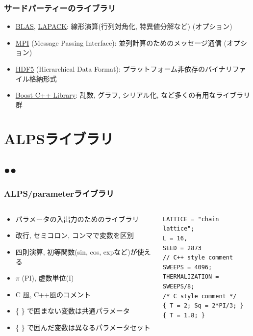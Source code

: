 \begin{frame}
  \frametitle{サードパーティーのライブラリ}
  \begin{itemize}
    \setlength{\itemsep}{1em}
  \item \href{http://www.netlib.org/blas/}{BLAS}, \href{http://www.netlib.org/lapack/}{LAPACK}: 線形演算(行列対角化, 特異値分解など) (オプション)
  \item \href{http://www.mpi-forum.org/}{MPI} (Message Passing Interface): 並列計算のためのメッセージ通信 (オプション)
  \item \href{http://www.hdfgroup.org/HDF5/}{HDF5} (Hierarchical Data Format): プラットフォーム非依存のバイナリファイル格納形式
  \item \href{http://www.boost.org/}{Boost C++ Library}: 乱数, グラフ, シリアル化, など多くの有用なライブラリ群
  \end{itemize}
\end{frame}

\section{ALPSライブラリ}
\subsection*{{\protect\color{red}●}{\protect\color{blue}●}}

\begin{frame}[t,fragile]
  \frametitle{ALPS/parameterライブラリ}
  \begin{columns}[T]
    \begin{column}{.5\textwidth}
      \begin{itemize}
      \item パラメータの入出力のためのライブラリ
        \item 改行, セミコロン, コンマで変数を区別
        \item 四則演算, 初等関数(sin, cos, expなど)が使える
        \item $\pi$ (PI), 虚数単位(I)
          \item C 風, C++風のコメント
          \item \{ \} で囲まない変数は共通パラメータ
          \item \{ \} で囲んだ変数は異なるパラメータセット
      \end{itemize}
    \end{column}
    \begin{column}{.5\textwidth}
    \begin{lstlisting}
LATTICE = "chain lattice";
L = 16,
SEED = 2873
// C++ style comment
SWEEPS = 4096;
THERMALIZATION = SWEEPS/8;
/* C style comment */
{ T = 2; Sq = 2*PI/3; }
{ T = 1.8; }
\end{lstlisting}
    \end{column}
  \end{columns}
\end{frame}

